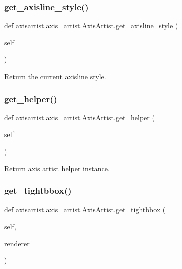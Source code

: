 \subsubsection{\texorpdfstring{get\+\_\+axisline\+\_\+style()}{get\_axisline\_style()}}
{\footnotesize\ttfamily def axisartist.\+axis\+\_\+artist.\+Axis\+Artist.\+get\+\_\+axisline\+\_\+style (\begin{DoxyParamCaption}\item[{}]{self }\end{DoxyParamCaption})}

\begin{DoxyVerb}Return the current axisline style.\end{DoxyVerb}
 \mbox{\label{classaxisartist_1_1axis__artist_1_1AxisArtist_a57ba1b5273342d7aa509f69ea66fc5f3}} 
\subsubsection{\texorpdfstring{get\+\_\+helper()}{get\_helper()}}
{\footnotesize\ttfamily def axisartist.\+axis\+\_\+artist.\+Axis\+Artist.\+get\+\_\+helper (\begin{DoxyParamCaption}\item[{}]{self }\end{DoxyParamCaption})}

\begin{DoxyVerb}Return axis artist helper instance.
\end{DoxyVerb}
 \mbox{\label{classaxisartist_1_1axis__artist_1_1AxisArtist_a146599e76572321f58defdc8365d4083}} 
\subsubsection{\texorpdfstring{get\+\_\+tightbbox()}{get\_tightbbox()}}
{\footnotesize\ttfamily def axisartist.\+axis\+\_\+artist.\+Axis\+Artist.\+get\+\_\+tightbbox (\begin{DoxyParamCaption}\item[{}]{self,  }\item[{}]{renderer }\end{DoxyParamCaption})}

